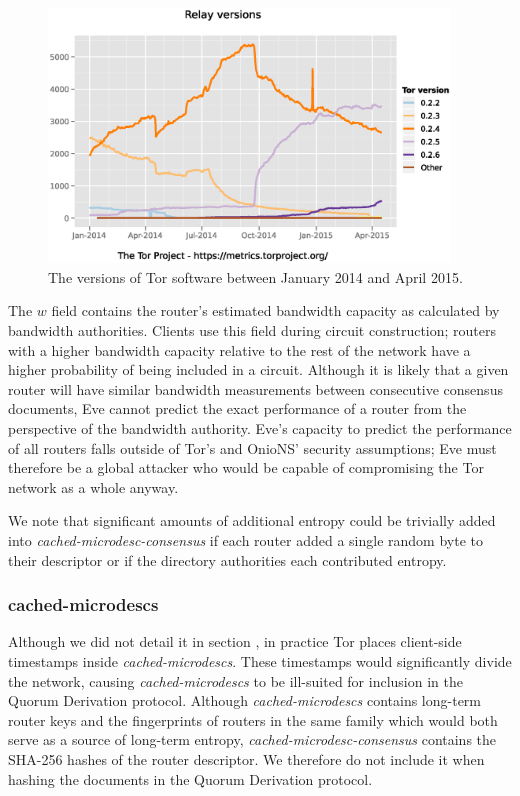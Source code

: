 \begin{figure}[htbp]
	\centering
	\includegraphics[width=0.95\textwidth]{images/Tor/versions_2014-01_2015-04.eps}
	\caption{The versions of Tor software between January 2014 and April 2015.\cite{TorMetrics}}
	\label{fig:TorVersions}
\end{figure}

The $ w $ field contains the router's estimated bandwidth capacity as calculated by bandwidth authorities. Clients use this field during circuit construction; routers with a higher bandwidth capacity relative to the rest of the network have a higher probability of being included in a circuit. Although it is likely that a given router will have similar bandwidth measurements between consecutive consensus documents, Eve cannot predict the exact performance of a router from the perspective of the bandwidth authority. Eve's capacity to predict the performance of all routers falls outside of Tor's and OnioNS' security assumptions; Eve must therefore be a global attacker who would be capable of compromising the Tor network as a whole anyway.

We note that significant amounts of additional entropy could be trivially added into \emph{cached-microdesc-consensus} if each router added a single random byte to their descriptor or if the directory authorities each contributed entropy.

\subsubsection{cached-microdescs}

Although we did not detail it in section \cite{TorDirSpec}, in practice Tor places client-side timestamps inside \emph{cached-microdescs}. These timestamps would significantly divide the network, causing \emph{cached-microdescs} to be ill-suited for inclusion in the Quorum Derivation protocol. Although \emph{cached-microdescs} contains long-term router keys and the fingerprints of routers in the same family which would both serve as a source of long-term entropy, \emph{cached-microdesc-consensus} contains the SHA-256 hashes of the router descriptor. We therefore do not include it when hashing the documents in the Quorum Derivation protocol.

